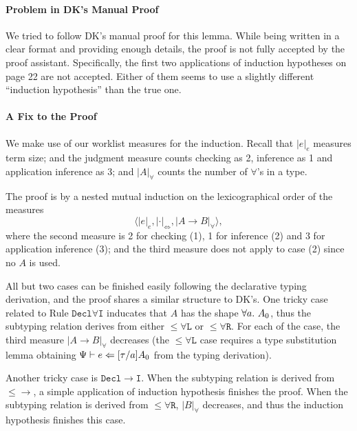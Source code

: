 \paragraph{Problem in DK's Manual Proof}
We tried to follow DK's manual proof for this lemma.
While being written in a clear format and providing enough details,
the proof is not fully accepted by the proof assistant.
Specifically, the first two applications of induction hypotheses on page 22 are not accepted.
Either of them seems to use a slightly different ``induction hypothesis'' than the true one.

\paragraph{A Fix to the Proof}
We make use of our worklist measures for the induction.
Recall that $|e|_e$ measures term size;
and the judgment measure counts checking as 2, inference as 1 and application inference as 3;
and $|A|_\forall$ counts the number of $\forall$'s in a type.

The proof is by a nested mutual induction on the lexicographical order of the measures
$$\langle |e|_e, |\cdot|_\Leftrightarrow, |A \to B|_\forall \rangle,$$
where the second measure is 2 for checking (1), 1 for inference (2) and 3 for application inference (3);
and the third measure does not apply to case (2) since no $A$ is used.

All but two cases can be finished easily following the declarative typing derivation,
and the proof shares a similar structure to DK's.
One tricky case related to Rule $\mathtt{Decl\forall I}$ inducates that $A$ has the shape $\all A_0$,
thus the subtyping relation derives from either $\mathtt{{\le}\forall L}$ or $\mathtt{{\le}\forall R}$.
For each of the case, the third measure $|A \to B|_\forall$ decreases
(the $\mathtt{{\le}\forall L}$ case requires a type substitution lemma obtaining
$\Psi \vdash e \Leftarrow [\tau/a]A_0$ from the typing derivation).

Another tricky case is $\mathtt{Decl{\to}I}$.
When the subtyping relation is derived from $\mathtt{{\le}{\to}}$,
a simple application of induction hypothesis finishes the proof.
When the subtyping relation is derived from $\mathtt{{\le}\forall R}$,
$|B|_\forall$ decreases, and thus the induction hypothesis finishes this case.
